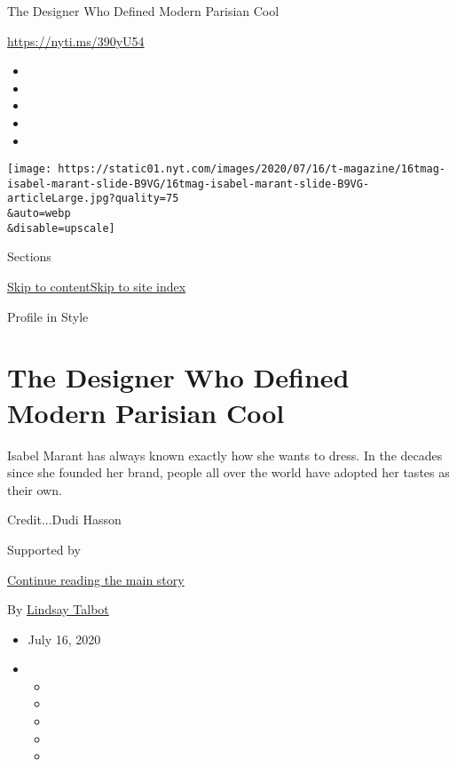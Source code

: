 The Designer Who Defined Modern Parisian Cool

\url{https://nyti.ms/390yU54}

\begin{itemize}
\item
\item
\item
\item
\item
\end{itemize}

\texttt{[image: https://static01.nyt.com/images/2020/07/16/t-magazine/16tmag-isabel-marant-slide-B9VG/16tmag-isabel-marant-slide-B9VG-articleLarge.jpg?quality=75\\\&auto=webp\\\&disable=upscale]}

Sections

\protect\hyperlink{site-content}{Skip to
content}\protect\hyperlink{site-index}{Skip to site index}

Profile in Style

\hypertarget{the-designer-who-defined-modern-parisian-cool}{%
\section{The Designer Who Defined Modern Parisian
Cool}\label{the-designer-who-defined-modern-parisian-cool}}

Isabel Marant has always known exactly how she wants to dress. In the
decades since she founded her brand, people all over the world have
adopted her tastes as their own.

Credit...Dudi Hasson

Supported by

\protect\hyperlink{after-sponsor}{Continue reading the main story}

By \href{https://www.nytimes.com/by/lindsay-talbot}{Lindsay Talbot}

\begin{itemize}
\item
  July 16, 2020
\item
  \begin{itemize}
  \item
  \item
  \item
  \item
  \item
  \end{itemize}
\end{itemize}

